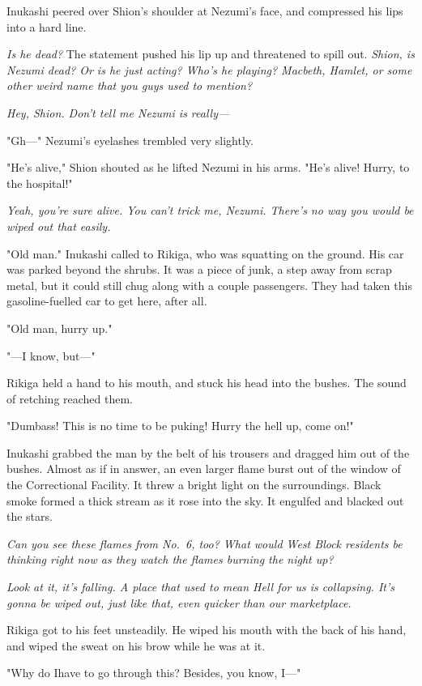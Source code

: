 Inukashi peered over Shion's shoulder at Nezumi's face, and compressed
his lips into a hard line.

\emph{Is he dead?} The statement pushed his lip up and threatened to spill out.
\emph{Shion, is Nezumi dead? Or is he just acting? Who's he playing? Macbeth,
Hamlet, or some other weird name that you guys used to mention?}

\emph{Hey, Shion. Don't tell me Nezumi is really---}

"Gh---" Nezumi's eyelashes trembled very slightly.

"He's alive," Shion shouted as he lifted Nezumi in his arms. "He's
alive! Hurry, to the hospital!"

\emph{Yeah, you're sure alive. You can't trick me, Nezumi. There's no way you
would be wiped out that easily.}

"Old man." Inukashi called to Rikiga, who was squatting on the ground.
His car was parked beyond the shrubs. It was a piece of junk, a step
away from scrap metal, but it could still chug along with a couple
passengers. They had taken this gasoline-fuelled car to get here, after
all.

"Old man, hurry up."

"---I know, but---"

Rikiga held a hand to his mouth, and stuck his head into the bushes. The
sound of retching reached them.

"Dumbass! This is no time to be puking! Hurry the hell up, come on!"

Inukashi grabbed the man by the belt of his trousers and dragged him out
of the bushes. Almost as if in answer, an even larger flame burst out of
the window of the Correctional Facility. It threw a bright light on the
surroundings. Black smoke formed a thick stream as it rose into the sky.
It engulfed and blacked out the stars.

\emph{Can you see these flames from No.~6, too? What would West Block
residents be thinking right now as they watch the flames burning the
night up?}

\emph{Look at it, it's falling. A place that used to mean Hell for us is
collapsing. It's gonna be wiped out, just like that, even quicker than
our marketplace.}

Rikiga got to his feet unsteadily. He wiped his mouth with the back of
his hand, and wiped the sweat on his brow while he was at it.

"Why do I\el have to go through this? Besides, you know, I---"

